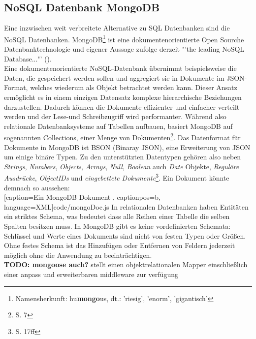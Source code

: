 \subsection{NoSQL Datenbank MongoDB}
Eine inzwischen weit verbreitete Alternative zu \gls{SQL} Datenbanken sind die \gls{NoSQL} Datenbanken. MongoDB\footnote{ Namensherkunft: hu\textbf{mongo}us, dt.: 'riesig', 'enorm', 'gigantisch'} ist eine dokumentenorientierte Open Sourche Datenbanktechnologie und eigener Aussage zufolge derzeit "'the leading NoSQL Database..."' (\cite{mongodb}). \\
Eine dokumentenorientierte \gls{NoSQL}-Datenbank übernimmt beispielsweise die Daten, die gespeichert werden sollen und aggregiert sie in Dokumente im \gls{JSON}-Format, welches wiederum als Objekt betrachtet werden kann. Dieser Ansatz ermöglicht es in einem einzigen Datensatz komplexe hierarchische Beziehungen darzustellen. Dadurch können die Dokumente effizienter und einfacher verteilt werden und der Lese-und Schreibzugriff wird performanter. Während also relationale Datenbanksysteme auf Tabellen aufbauen, basiert MongoDB auf sogenannten Collections, einer Menge von Dokumenten\footnote{ \cite{mongoDef} S. 7}. Das Datenformat für Dokumente in MongoDB ist BSON (Binaray JSON), eine Erweiterung von \gls{JSON} um einige binäre Typen. Zu den unterstützten Datentypen gehören also neben \textit{Strings}, \textit{Numbers}, \textit{Objects}, \textit{Arrays}, \textit{Null}, \textit{Boolean} auch \textit{Date} Objekte, \textit{Reguläre Ausdrücke}, \textit{ObjectIDs} und \textit{eingebettete Dokumente}\footnote{\cite{mongoDef} S. 17ff}. Ein Dokument könnte demnach so aussehen: \\

	[caption={Ein MongoDB Dokument}
	\label{code:mongo}, captionpos=b, language=XML]{code/mongoDoc.js}
In relationalen Datenbanken haben Entitäten ein striktes Schema, was bedeutet dass alle Reihen einer Tabelle die selben Spalten besitzen muss. In MongoDB gibt es keine vordefinierten Schemata: Schlüssel und Werte eines Dokuments sind nicht von festen Typen oder Größen. Ohne festes Schema ist das Hinzufügen oder Entfernen von Feldern jederzeit möglich ohne die Anwendung zu beeinträchtigen.\\
\textbf{\large TODO: mongoose auch?}
stellt einen objektrelationalen Mapper einschließlich einer anpass und erweiterbaren middleware zur verfügung
